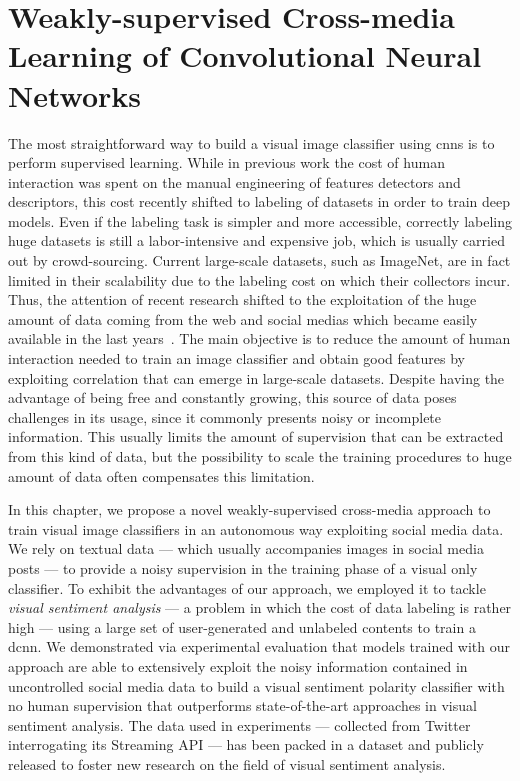 
\graphicspath{{img/vsa/}}

\newcommand{\BTSA}{B-T4SA}
\newcommand{\ourFtAlex}{Hybrid-T4SA}
\newcommand{\ourFtVGG}{VGG-T4SA}

\chapter{Weakly-supervised Cross-media Learning of Convolutional Neural Networks}
\label{ch:cross-media}

The most straightforward way to build a visual image classifier using \glspl{cnn} is to perform supervised learning.
While in previous work the cost of human interaction was spent on the manual engineering of features detectors and descriptors, this cost recently shifted to labeling of datasets in order to train deep models.
Even if the labeling task is simpler and more accessible, correctly labeling huge datasets is still a labor-intensive and expensive job, which is usually carried out by crowd-sourcing.
Current large-scale datasets, such as ImageNet, are in fact limited in their scalability due to the labeling cost on which their collectors incur.
Thus, the attention of recent research shifted to the exploitation of the huge amount of data coming from the web and social medias which became easily available in the last years~\cite{sun2017revisiting,mahajan2018exploring}.
The main objective is to reduce the amount of human interaction needed to train an image classifier and obtain good features by exploiting correlation that can emerge in large-scale datasets.
Despite having the advantage of being free and constantly growing, this source of data poses challenges in its usage, since it commonly presents noisy or incomplete information.
This usually limits the amount of supervision that can be extracted from this kind of data, but the possibility to scale the training procedures to huge amount of data often compensates this limitation.

In this chapter, we propose a novel weakly-supervised cross-media approach to train visual image classifiers in an autonomous way exploiting social media data.
We rely on textual data --- which usually accompanies images in social media posts --- to provide a noisy supervision in the training phase of a visual only classifier.
To exhibit the advantages of our approach, we employed it to tackle \emph{visual sentiment analysis} --- a problem in which the cost of data labeling is rather high --- using a large set of user-generated and unlabeled contents to train a \acrfull{dcnn}.
We demonstrated via experimental evaluation that models trained with our approach are able to extensively exploit the noisy information contained in uncontrolled social media data to build a visual sentiment polarity classifier with no human supervision that outperforms state-of-the-art approaches in visual sentiment analysis.
The data used in experiments --- collected from Twitter interrogating its Streaming API --- has been packed in a dataset and publicly released to foster new research on the field of visual sentiment analysis.

